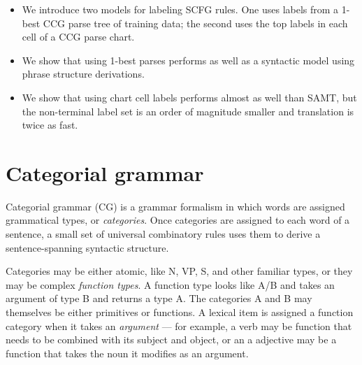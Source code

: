 \documentclass[a4paper]{article}
\begin{document}
%
%
\begin{itemize}
\item We introduce two models for labeling SCFG rules. One uses labels from a 1-best CCG parse tree of training data; the second uses the top labels in each cell of a CCG parse chart.
\item We show that using 1-best parses performs as well as a syntactic model using phrase structure derivations.
\item We show that using chart cell labels performs almost as well than SAMT, but the non-terminal label set is an order of magnitude smaller and translation is twice as fast.
\end{itemize}

\section{Categorial grammar}
\label{sec:cg}

Categorial grammar (CG) \cite{cg,bar-hillel-cg} is a grammar formalism in which words are assigned grammatical types, or {\em categories}. Once categories are assigned to each word of a sentence, a small set of universal combinatory rules uses them to derive a sentence-spanning syntactic structure.

Categories may be either atomic, like N, VP, S, and other familiar types, or they may be complex {\em function types}. A function type looks like A/B and takes an argument of type B and returns a type A. The categories A and B may themselves be either primitives or functions. A lexical item is assigned a function category when it takes an {\em argument} --- for example, a verb may be function that needs to be combined with its subject and object, or an a adjective may be a function that takes the noun it modifies as an argument.
\end{document}
